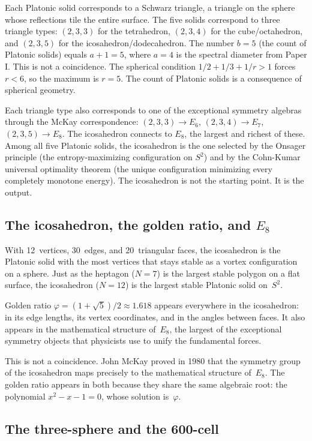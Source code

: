 Each Platonic solid corresponds to a Schwarz triangle, a triangle
on the sphere whose reflections tile the entire surface. The five
solids correspond to three triangle types: $(2,3,3)$ for the
tetrahedron, $(2,3,4)$ for the cube/octahedron, and $(2,3,5)$
for the icosahedron/dodecahedron. The number $b = 5$ (the count of
Platonic solids) equals $a + 1 = 5$, where $a = 4$ is the spectral
diameter from Paper I. This is not a coincidence. The spherical
condition $1/2 + 1/3 + 1/r > 1$ forces $r < 6$, so the maximum
is $r = 5$. The count of Platonic solids is a consequence of
spherical geometry.

Each triangle type also corresponds to one of the exceptional
symmetry algebras through the McKay correspondence:
$(2,3,3) \to E_6$, $(2,3,4) \to E_7$, $(2,3,5) \to E_8$.
The icosahedron connects to $E_8$, the largest and richest of these.
Among all five Platonic solids, the icosahedron is the one selected
by the Onsager principle (the entropy-maximizing configuration on
$S^2$) and by the Cohn-Kumar universal optimality theorem
(the unique configuration minimizing every completely monotone
energy). The icosahedron is not the starting point. It is the output.

\subsection*{The icosahedron, the golden ratio, and $E_8$}

With 12~vertices, 30~edges, and 20~triangular faces,
the icosahedron is the Platonic solid with the most vertices that stays stable as a
vortex configuration on a sphere. Just as the heptagon ($N = 7$) is the
largest stable polygon on a flat surface, the icosahedron ($N = 12$) is
the largest stable Platonic solid on~$S^2$.

Golden ratio $\varphi = (1 + \sqrt{5})/2 \approx 1.618$ appears
everywhere in the icosahedron: in its edge lengths, its vertex
coordinates, and in the angles between faces. It also appears in the
mathematical structure of~$E_8$, the largest of the exceptional
symmetry objects that physicists use to unify the fundamental forces.

This is not a coincidence. John McKay proved in 1980 that the symmetry
group of the icosahedron maps precisely to the mathematical structure
of~$E_8$. The golden ratio appears in both because they share the same
algebraic root: the polynomial $x^2 - x - 1 = 0$, whose solution
is~$\varphi$.

\subsection*{The three-sphere and the 600-cell}

